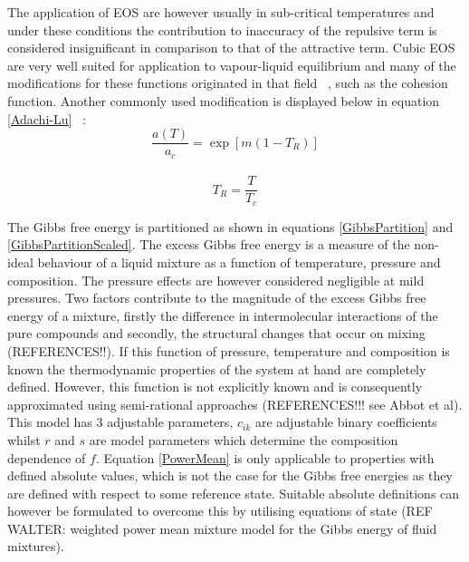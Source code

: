 The application of EOS are however usually in sub-critical temperatures and under these conditions the contribution to inaccuracy of the repulsive term is considered insignificant in comparison to that of the attractive term. Cubic EOS are very well suited for application to vapour-liquid equilibrium and many of the modifications for these functions originated in that field ~\cite{Parsafar}, such as the cohesion function. Another commonly used modification is displayed below in equation \ref{Adachi-Lu} ~\cite{Adachi-Lu}:
			\begin{equation}
					 \dfrac{a\left(T\right)}{a_{c}}= \exp \left[m\left(1-T_{R}\right)\right] \label{Adachi-Lu}
			\end{equation}\\
			\begin{equation}
					T_{R} = \dfrac{T}{T_{c}}
			\end{equation}%
			
				
								
The Gibbs free energy is partitioned as shown in equations \ref{GibbsPartition} and \ref{GibbsPartitionScaled}. The excess Gibbs free energy is a measure of the non-ideal behaviour of a liquid mixture as a function of temperature, pressure and composition. The pressure effects are however considered negligible at mild pressures. Two factors contribute to the magnitude of the excess Gibbs free energy of a mixture, firstly the difference in intermolecular interactions of the pure compounds and secondly, the structural changes that occur on mixing (REFERENCES!!). If this function of pressure, temperature and composition is known the thermodynamic properties of the system at hand are completely defined. However, this function is not explicitly known and is consequently approximated using semi-rational approaches (REFERENCES!!! see Abbot et al).\\
				
				This model has 3 adjustable parameters, $c_{ik}$ are adjustable binary coefficients whilst $r$ and $s$ are model parameters which determine the composition dependence of $f$. Equation \ref{PowerMean} is only applicable to properties with defined absolute values, which is not the case for the Gibbs free energies as they are defined with respect to some reference state. Suitable absolute definitions can however be formulated to overcome this by utilising equations of state (REF WALTER: weighted power mean mixture model for the Gibbs energy of fluid mixtures).\\
				
